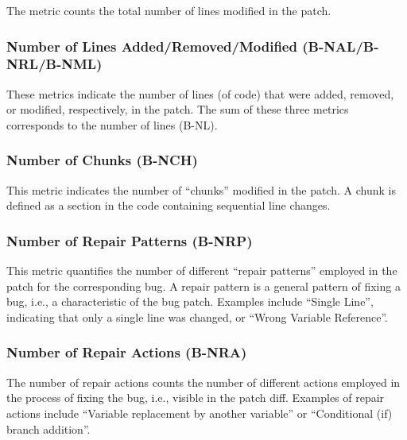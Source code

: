 The metric counts the total number of lines modified in the patch.

\subsubsection{Number of Lines Added/Removed/Modified (B-NAL/B-NRL/B-NML)}

These metrics indicate the number of lines (of code) that were added, removed,
or modified, respectively, in the patch. The sum of these three metrics
corresponds to the number of lines (B-NL).

\subsubsection{Number of Chunks (B-NCH)}

This metric indicates the number of \enquote{chunks} modified in the patch. A
chunk is defined as a section in the code containing sequential line changes.

\subsubsection{Number of Repair Patterns (B-NRP)}

This metric quantifies the number of different \enquote{repair patterns}
employed in the patch for the corresponding bug. A repair pattern is a general
pattern of fixing a bug, i.e., a characteristic of the bug patch. Examples
include  \enquote{Single Line}, indicating that only a single line was changed,
or \enquote{Wrong Variable Reference}.

\subsubsection{Number of Repair Actions (B-NRA)}

The number of repair actions counts the number of different actions employed in
the process of fixing the bug, i.e., visible in the patch diff. Examples of
repair actions include \enquote{Variable replacement by another variable} or
\enquote{Conditional (if) branch addition}.
